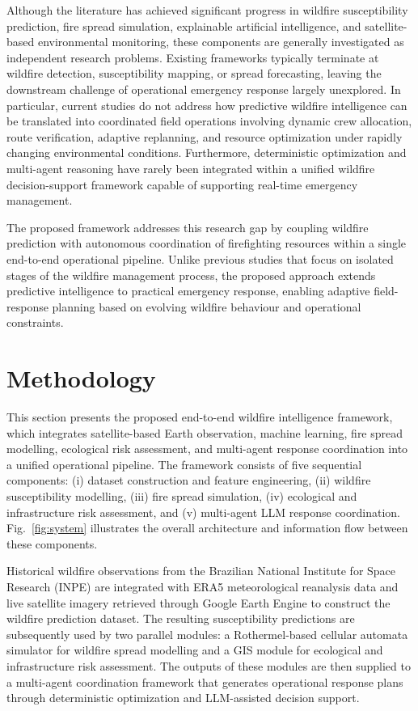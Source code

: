 \documentclass{ieeeaccess}
\begin{document}
Although the literature has achieved significant progress in wildfire susceptibility prediction, fire spread simulation, explainable artificial intelligence, and satellite-based environmental monitoring, these components are generally investigated as independent research problems. Existing frameworks typically terminate at wildfire detection, susceptibility mapping, or spread forecasting, leaving the downstream challenge of operational emergency response largely unexplored. In particular, current studies do not address how predictive wildfire intelligence can be translated into coordinated field operations involving dynamic crew allocation, route verification, adaptive replanning, and resource optimization under rapidly changing environmental conditions. Furthermore, deterministic optimization and multi-agent reasoning have rarely been integrated within a unified wildfire decision-support framework capable of supporting real-time emergency management.

The proposed framework addresses this research gap by coupling wildfire prediction with autonomous coordination of firefighting resources within a single end-to-end operational pipeline. Unlike previous studies that focus on isolated stages of the wildfire management process, the proposed approach extends predictive intelligence to practical emergency response, enabling adaptive field-response planning based on evolving wildfire behaviour and operational constraints.

\section{Methodology}

This section presents the proposed end-to-end wildfire intelligence framework, which integrates satellite-based Earth observation, machine learning, fire spread modelling, ecological risk assessment, and multi-agent response coordination into a unified operational pipeline. The framework consists of five sequential components: (i) dataset construction and feature engineering, (ii) wildfire susceptibility modelling, (iii) fire spread simulation, (iv) ecological and infrastructure risk assessment, and (v) multi-agent LLM response coordination. Fig.~\ref{fig:system} illustrates the overall architecture and information flow between these components.

Historical wildfire observations from the Brazilian National Institute for Space Research (INPE) are integrated with ERA5 meteorological reanalysis data and live satellite imagery retrieved through Google Earth Engine to construct the wildfire prediction dataset. The resulting susceptibility predictions are subsequently used by two parallel modules: a Rothermel-based cellular automata simulator for wildfire spread modelling and a GIS module for ecological and infrastructure risk assessment. The outputs of these modules are then supplied to a multi-agent coordination framework that generates operational response plans through deterministic optimization and LLM-assisted decision support.
\end{document}

